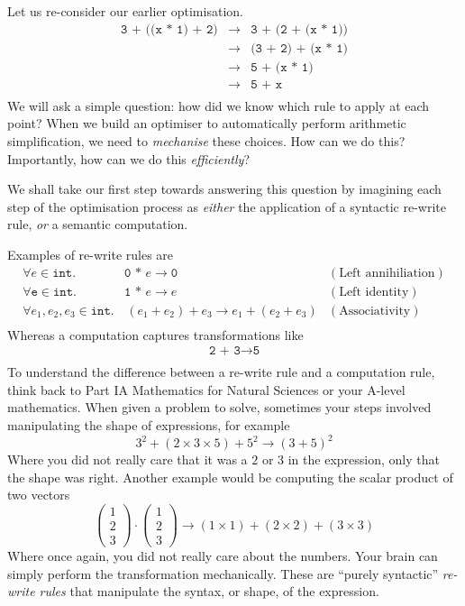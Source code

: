 Let us re-consider our earlier optimisation. 
\[\begin{array}{rcl}
    \texttt{3 + ((x * 1) + 2)} & \to & \texttt{3 + (2 + (x * 1))} \\
                               & \to & \texttt{(3 + 2) + (x * 1)}\\
                               & \to & \texttt{5 + (x * 1)}\\
                               & \to & \texttt{5 + x}\\
\end{array}\]
We will ask a simple question: how did we know which rule to apply at each point? When we build an optimiser to automatically perform arithmetic simplification, we need to \textit{mechanise} these choices. How can we do this? Importantly, how can we do this \textit{efficiently}?

We shall take our first step towards answering this question by imagining each step of the optimisation process as \textit{either} the application of a syntactic re-write rule, \textit{or} a semantic computation.

Examples of re-write rules are
\[\begin{array}{llr}
    \forall e \in \texttt{int}. \, & \texttt{0 * } e \to \texttt{0} & (\text{Left annihiliation}) \\
    \forall \texttt{e} \in \texttt{int}. \, & \texttt{1 * } e \to e & (\text{Left identity}) \\
     \forall e_1, e_2, e_3 \in \texttt{int}. & \, (e_1 + e_2) + e_3 \to e_1 + (e_2 + e_3) & (\text{Associativity}) \\
\end{array}\]
Whereas a computation captures transformations like
\[\begin{array}{l}
    \texttt{2 + 3} \to \texttt{5} \\
\end{array}\]
To understand the difference between a re-write rule and a computation rule, think back to \textsf{Part IA Mathematics for Natural Sciences} or your A-level mathematics. When given a problem to solve, sometimes your steps involved manipulating the shape of expressions, for example
\[3^2 + (2\times 3 \times 5) + 5^2 \to (3+5)^2\]
Where you did not really care that it was a $2$ or $3$ in the expression, only that the shape was right. Another example would be computing the scalar product of two vectors
\[\begin{pmatrix}1\\2\\3\end{pmatrix} \cdot \begin{pmatrix}1\\2\\3\end{pmatrix} \to (1 \times 1) + (2 \times 2) + (3 \times 3)\]
Where once again, you did not really care about the numbers. Your brain can simply perform the transformation mechanically. These are ``purely syntactic'' \textit{re-write rules} that manipulate the syntax, or shape, of the expression. 

